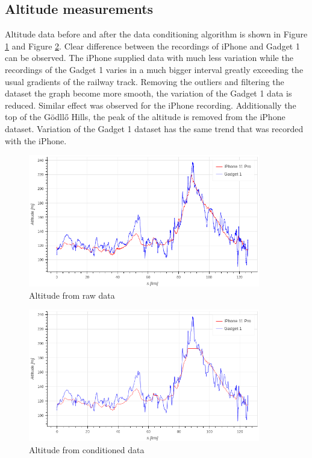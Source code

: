 \documentclass{article}
\begin{document}
		\subsection{Altitude measurements}
			Altitude data before and after the data conditioning algorithm is shown in Figure \ref{fig:raw_alt} and Figure \ref{fig:cond_alt}. Clear difference between the recordings of iPhone and Gadget 1 can be observed. The iPhone supplied data with much less variation while the recordings of the Gadget 1 varies in a much bigger interval greatly exceeding the usual gradients of the railway track. Removing the outliers and filtering the dataset the graph become more smooth, the variation of the Gadget 1 data is reduced. Similar effect was observed for the iPhone recording. Additionally the top of the Gödllő Hills, the peak of the altitude is removed from the iPhone dataset. Variation of the Gadget 1 dataset has the same trend that was recorded with the iPhone.
			\begin{figure}[h]
				\centering
			   	\includegraphics[width=0.9\textwidth]{raw_alt.png}
			   \caption{Altitude from raw data}
			   \label{fig:raw_alt}
			\end{figure}
			\begin{figure}[h]
				\centering
			   \includegraphics[width=0.9\textwidth]{cond_alt.png}
			   \caption{Altitude from conditioned data}
			   \label{fig:cond_alt}
			\end{figure}
\end{document}

